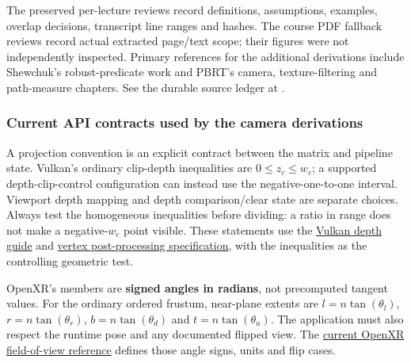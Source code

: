 The preserved per-lecture reviews record definitions, assumptions, examples, overlap decisions, transcript line ranges and hashes. The course PDF fallback reviews record actual extracted page/text scope; their figures were not independently inspected. Primary references for the additional derivations include Shewchuk's robust-predicate work and PBRT's camera, texture-filtering and path-measure chapters. See the durable source ledger at .

\subsubsection{Current API contracts used by the camera derivations}\label{02-foundations-ii-ch039-current-api-contracts-used-by-the-camera-derivations}

\hypertarget{02-foundations-ii-ch039-current-api-contracts-used-by-the-camera-derivations}{}

A projection convention is an explicit contract between the matrix and pipeline state. Vulkan's ordinary clip-depth inequalities are \(0\le z_c\le w_c\); a supported depth-clip-control configuration can instead use the negative-one-to-one interval. Viewport depth mapping and depth comparison/clear state are separate choices. Always test the homogeneous inequalities before dividing: a ratio in range does not make a negative-\(w_c\) point visible. These statements use the \href{https://docs.vulkan.org/guide/latest/depth.html}{Vulkan depth guide} and \href{https://docs.vulkan.org/spec/latest/chapters/vertexpostproc.html}{vertex post-processing specification}, with the inequalities as the controlling geometric test.

OpenXR's  members are \textbf{signed angles in radians}, not precomputed tangent values. For the ordinary ordered frustum, near-plane extents are \(l=n\tan(\theta_l)\), \(r=n\tan(\theta_r)\), \(b=n\tan(\theta_d)\) and \(t=n\tan(\theta_u)\). The application must also respect the runtime pose and any documented flipped view. The \href{https://registry.khronos.org/OpenXR/specs/1.1/man/html/XrFovf.html}{current OpenXR field-of-view reference} defines those angle signs, units and flip cases.

